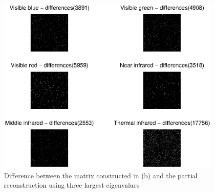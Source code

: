 \begin{figure}[htb]
 \centering
 \includegraphics[width=\linewidth]{differences_pca.eps}
 \caption{Difference between the matrix constructed in (b) and the partial reconstruction using three largest eigenvalues}
 \label{fig:differences_pca}
\end{figure}
\clearpage